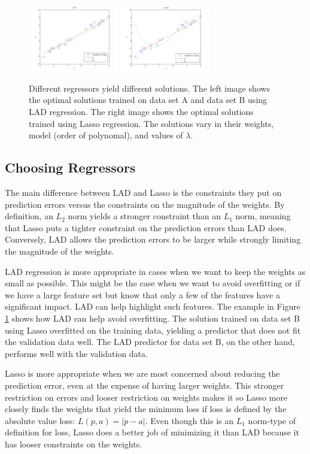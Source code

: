 \documentclass[10pt]{article}   %
\theoremstyle{plain}
\begin{document}
\begin{figure}[h!]\label{lad-lasso}
  \caption{Different regressors yield different solutions. The left image shows the optimal solutions trained on data set A and data set B using LAD regression. The right image shows the optimal solutions trained using Lasso regression. The solutions vary in their weights, model (order of polynomal), and values of $\lambda$. }
  \centering
    \includegraphics[width=0.35\textwidth]{figures/4_1_lad_fit_results.png}
    \includegraphics[width=0.35\textwidth]{figures/4_2_lasso_fit_results.png}
\end{figure}

\subsection{Choosing Regressors}

The main difference between LAD and Lasso is the constraints they put on prediction errors versus the constraints on the magnitude of the weights. By definition, an $L_2$ norm yields a stronger constraint than an $L_1$ norm, meaning that Lasso puts a tighter constraint on the prediction errors than LAD does. Conversely, LAD allows the prediction errors to be larger while strongly limiting the magnitude of the weights. 

LAD regression is more appropriate in cases when we want to keep the weights as small as possible. This might be the case when we want to avoid overfitting or if we have a large feature set but know that only a few of the features have a significant impact. LAD can help highlight such features. The example in Figure \ref{lad-lasso} shows how LAD can help avoid overfitting. The solution trained on data set B using Lasso overfitted on the training data, yielding a predictor that does not fit the validation data well. The LAD predictor for data set B, on the other hand, performs well with the validation data.

Lasso is more appropriate when we are most concerned about reducing the prediction error, even at the expense of having larger weights. This stronger restriction on errors and looser restriction on weights makes it so Lasso more closely finds the weights that yield the minimum loss if loss is defined by the absolute value loss: $L(p,a) = |p - a|$. Even though this is an $L_1$ norm-type of definition for loss, Lasso does a better job of minimizing it than LAD because it has looser constraints on the weights.
\end{document}
